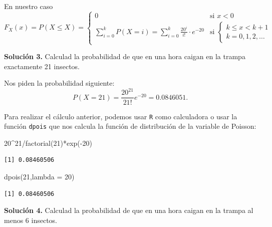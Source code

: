 \documentclass[
  letterpaper,
  DIV=11,
  numbers=noendperiod]{scrreprt}
\newenvironment{Shaded}{\begin{snugshade}}{\end{snugshade}}
\newcommand{\AttributeTok}[1]{\textcolor[rgb]{0.40,0.45,0.13}{#1}}
\newcommand{\DecValTok}[1]{\textcolor[rgb]{0.68,0.00,0.00}{#1}}
\newcommand{\FunctionTok}[1]{\textcolor[rgb]{0.28,0.35,0.67}{#1}}
\newcommand{\NormalTok}[1]{\textcolor[rgb]{0.00,0.23,0.31}{#1}}
\newcommand{\SpecialCharTok}[1]{\textcolor[rgb]{0.37,0.37,0.37}{#1}}
\begin{document}
En nuestro caso \[
F_X(x)=P(X\leq X)=
\left\{\begin{array}{ll} 
0 & \mbox{si } x<0\\
\displaystyle\sum_{i=0}^{k} P(X=i)=\sum_{i=0}^{k}\frac{20^i}{i!}\cdot e^{-20} & \mbox{si }
\left\{\begin{array}{l}
k\leq x< k+1\\k=0,1,2,\ldots
\end{array}
\right.
\end{array}
\right.
\]

\textbf{Solución 3.} Calculad la probabilidad de que en una hora caigan
en la trampa exactamente 21 insectos.

Nos piden la probabilidad siguiente: \[
P(X=21)=\frac{20^{21}}{21!} e^{-20}=0.0846051.
\]

Para realizar el cálculo anterior, podemos usar \texttt{R} como
calculadora o usar la función \texttt{dpois} que nos calcula la función
de distribución de la variable de Poisson:

\begin{Shaded}
\begin{Highlighting}[]
\DecValTok{20}\SpecialCharTok{\^{}}\DecValTok{21}\SpecialCharTok{/}\FunctionTok{factorial}\NormalTok{(}\DecValTok{21}\NormalTok{)}\SpecialCharTok{*}\FunctionTok{exp}\NormalTok{(}\SpecialCharTok{{-}}\DecValTok{20}\NormalTok{)}
\end{Highlighting}
\end{Shaded}

\begin{verbatim}
[1] 0.08460506
\end{verbatim}

\begin{Shaded}
\begin{Highlighting}[]
\FunctionTok{dpois}\NormalTok{(}\DecValTok{21}\NormalTok{,}\AttributeTok{lambda =} \DecValTok{20}\NormalTok{)}
\end{Highlighting}
\end{Shaded}

\begin{verbatim}
[1] 0.08460506
\end{verbatim}

\textbf{Solución 4.} Calculad la probabilidad de que en una hora caigan
en la trampa al menos 6 insectos.
\end{document}
